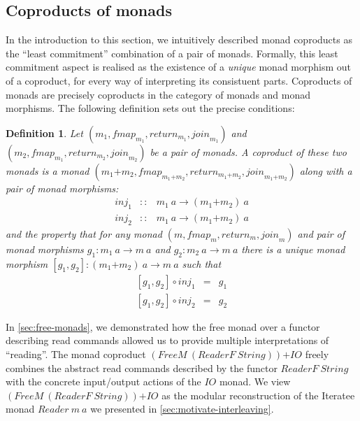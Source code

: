 \documentclass{jfp1}
\newtheorem{definition}{Definition}
\begin{document}
\subsection{Coproducts of monads}
\label{sec:coproducts-of-monads}

\newcommand{\cprd}[2]{#1\mathord{+}#2}

In the introduction to this section, we intuitively described monad
coproducts as the ``least commitment'' combination of a pair of
monads. Formally, this least commitment aspect is realised as the
existence of a \emph{unique} monad morphism out of a coproduct, for
every way of interpreting its consistuent parts. Coproducts of monads
are precisely coproducts in the category of monads and monad
morphisms. The following definition sets out the precise conditions:
\begin{definition}\label{defn:coproducts}
  Let $(m_1, \mathit{fmap}_{m_1}, \mathit{return}_{m_1}, \mathit{join}_{m_1})$ and $(m_2,
  \mathit{fmap}_{m_1}, \mathit{return}_{m_2}, \mathit{join}_{m_2})$ be a pair of monads. A \emph{coproduct} of these two monads is a
  monad $(\cprd{m_1}{m_2}, \mathit{fmap}_{\cprd{m_1}{m_2}}, \mathit{return}_{\cprd{m_1}{m_2}},
  \mathit{join}_{\cprd{m_1}{m_2}})$ along with a pair of monad morphisms:
  \begin{displaymath}
    \begin{array}{rcl}
      \mathit{inj}_1 & :: & m_1~a \to (\cprd{m_1}{m_2})~a \\
      \mathit{inj}_2 & :: & m_1~a \to (\cprd{m_1}{m_2})~a
    \end{array}
  \end{displaymath}
  and the property that for any monad $(m,\mathit{fmap}_m,
  \mathit{return}_m, \mathit{join}_m)$ and pair of monad morphisms
  $g_1 : m_1~a \to m~a$ and $g_2 : m_2~a \to m~a$ there is a
  \emph{unique} monad morphism $[g_1,g_2] : (\cprd{m_1}{m_2})~a \to
  m~a$ such that
  \begin{displaymath}
    \begin{array}{rcl}
      {}[g_1,g_2] \circ \mathit{inj}_1 & = & g_1 \\
      {}[g_1,g_2] \circ \mathit{inj}_2 & = & g_2
    \end{array}
  \end{displaymath}
\end{definition}

In \autoref{sec:free-monads}, we demonstrated how the free monad over
a functor describing read commands allowed us to provide multiple
interpretations of ``reading''. 
The monad coproduct
$\cprd{(\mathit{FreeM}~(\mathit{ReaderF}~\mathit{String}))}{\mathit{IO}}$
freely combines the abstract read commands described by the functor
$\mathit{ReaderF}~\mathit{String}$ with the concrete input/output
actions of the $\mathit{IO}$ monad. We view
$\cprd{(\mathit{FreeM}~(\mathit{ReaderF}~\mathit{String}))}{\mathit{IO}}$
as the modular reconstruction of the Iteratee monad
$\mathit{Reader}~m~a$ we presented in
\autoref{sec:motivate-interleaving}.
\end{document}
